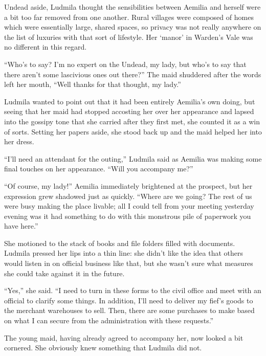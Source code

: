  

Undead aside, Ludmila thought the sensibilities between Aemilia and herself were a bit too far removed from one another. Rural villages were composed of homes which were essentially large, shared spaces, so privacy was not really anywhere on the list of luxuries with that sort of lifestyle. Her ‘manor’ in Warden’s Vale was no different in this regard.

 

“Who’s to say? I’m no expert on the Undead, my lady, but who’s to say that there aren’t some lascivious ones out there?” The maid shuddered after the words left her mouth, “Well thanks for that thought, my lady.”

 

Ludmila wanted to point out that it had been entirely Aemilia’s own doing, but seeing that her maid had stopped accosting her over her appearance and lapsed into the gossipy tone that she carried after they first met, she counted it as a win of sorts. Setting her papers aside, she stood back up and the maid helped her into her dress.

 

“I'll need an attendant for the outing,” Ludmila said as Aemilia was making some final touches on her appearance. “Will you accompany me?”

 

“Of course, my lady!” Aemilia immediately brightened at the prospect, but her expression grew shadowed just as quickly. “Where are we going? The rest of us were busy making the place livable; all I could tell from your meeting yesterday evening was it had something to do with this monstrous pile of paperwork you have here.”

 

She motioned to the stack of books and file folders filled with documents. Ludmila pressed her lips into a thin line: she didn’t like the idea that others would listen in on official business like that, but she wasn’t sure what measures she could take against it in the future.

 

“Yes,” she said. “I need to turn in these forms to the civil office and meet with an official to clarify some things. In addition, I’ll need to deliver my fief’s goods to the merchant warehouses to sell. Then, there are some purchases to make based on what I can secure from the administration with these requests.”

 

The young maid, having already agreed to accompany her, now looked a bit cornered. She obviously knew something that Ludmila did not.

